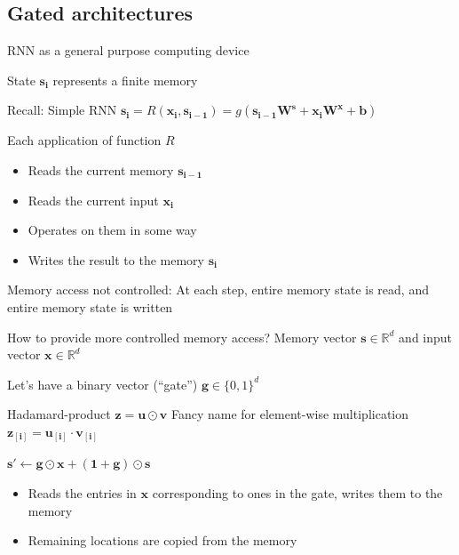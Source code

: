 \documentclass[12pt,aspectratio=169,handout]{beamer}
\begin{document}
\subsection{Gated architectures}

\begin{frame}{RNN as a general purpose computing device}

State $\bm{s_i}$ represents a finite memory

\begin{block}{Recall: Simple RNN}
$\bm{s_i} = R(\bm{x_i}, \bm{s_{i - 1}}) = g(\bm{s_{i-1}} \bm{W^s} + \bm{x_i} \bm{W^x} + \bm{b})$ 	
\end{block}
\pause
Each application of function $R$
\begin{itemize}
	\item Reads the current memory $\bm{s_{i-1}}$
	\item Reads the current input $\bm{x_i}$
	\item Operates on them in some way
	\item Writes the result to the memory $\bm{s_i}$
\end{itemize}
\pause Memory access not controlled: At each step, entire memory state is read, and entire memory state is written
\end{frame}

\begin{frame}{How to provide more controlled memory access?}
Memory vector $\bm{s} \in \mathbb{R}^d$ and input vector $\bm{x} \in \mathbb{R}^d$
\pause

Let's have a binary vector (``gate'') $\bm{g} \in \{0, 1\}^d$
\pause
\begin{block}{Hadamard-product $\bm{z} = \bm{u} \odot \bm{v}$}
Fancy name for element-wise multiplication
$\bm{z_{[i]}} = \bm{u_{[i]}} \cdot \bm{v_{[i]}}$
\end{block}
$
\bm{s'} \gets \bm{g} \odot \bm{x} + (\bm{1} + \bm{g}) \odot \bm{s}
$
\begin{itemize}
	\item \pause Reads the entries in $\bm{x}$ corresponding to ones in the gate, writes them to the memory
	\item \pause Remaining locations are copied from the memory
\end{itemize}

\end{frame}
\end{document}
